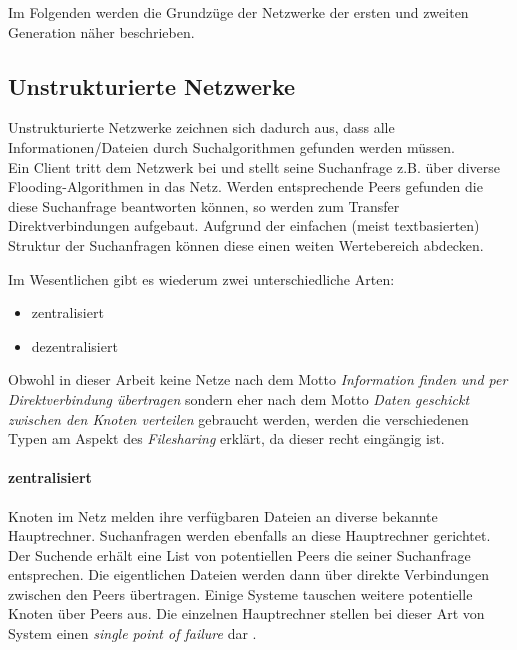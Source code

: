 Im Folgenden werden die Grundzüge der Netzwerke der ersten und zweiten Generation näher beschrieben.

\subsection{Unstrukturierte Netzwerke}
Unstrukturierte Netzwerke zeichnen sich dadurch aus, dass alle Informationen/Dateien durch Suchalgorithmen \cite{Lv2002} gefunden werden müssen. \\
Ein Client tritt dem Netzwerk bei und stellt seine Suchanfrage z.B. über diverse Flooding-Algorithmen in das Netz. Werden entsprechende Peers gefunden die diese Suchanfrage beantworten können, so werden zum Transfer Direktverbindungen aufgebaut. Aufgrund der einfachen (meist textbasierten) Struktur der Suchanfragen können diese einen weiten Wertebereich abdecken.

Im Wesentlichen gibt es wiederum zwei unterschiedliche Arten:
\begin{itemize}
\item zentralisiert
\item dezentralisiert
\end{itemize}

Obwohl in dieser Arbeit keine Netze nach dem Motto \emph{Information finden und per Direktverbindung übertragen} sondern eher nach dem Motto \emph{Daten geschickt zwischen den Knoten verteilen} gebraucht werden, werden die verschiedenen Typen am Aspekt des \emph{Filesharing} erklärt, da dieser recht eingängig ist.\\

\paragraph{zentralisiert} Knoten im Netz melden ihre verfügbaren Dateien an diverse bekannte Hauptrechner. Suchanfragen werden ebenfalls an diese Hauptrechner gerichtet. Der Suchende erhält eine List von potentiellen Peers die seiner Suchanfrage entsprechen. Die eigentlichen Dateien werden dann über direkte Verbindungen zwischen den Peers übertragen. Einige Systeme tauschen weitere potentielle Knoten über Peers aus. Die einzelnen Hauptrechner stellen bei dieser Art von System einen \emph{single point of failure} dar \cite{Eberspaecher2005}.

